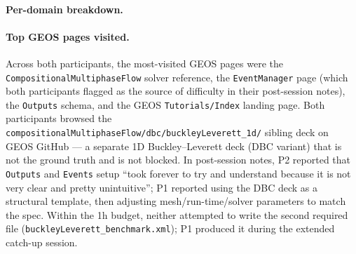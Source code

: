 \documentclass{article}
\begin{document}
\paragraph{Per-domain breakdown.}

\begin{table}[h]
  \caption{Browser-navigation breakdown during the one-hour authoring session, per participant. ``GEOS docs'' = visits to the GEOS Sphinx documentation host (\texttt{geosx-geosx.readthedocs-hosted.com}) including all subpages. ``GEOS GitHub'' = visits to \texttt{github.com/GEOS-DEV/GEOS}. ``Other'' = unrelated tabs that remained open during the session. No participant visited any LLM chatbot, Stack Overflow, or general scientific-paper site.}
  \label{tab:human-browser}
  \centering
  \small
\end{table}

\paragraph{Top GEOS pages visited.} Across both participants, the most-visited GEOS pages were the \texttt{CompositionalMultiphaseFlow} solver reference, the \texttt{EventManager} page (which both participants flagged as the source of difficulty in their post-session notes), the \texttt{Outputs} schema, and the GEOS \texttt{Tutorials/Index} landing page. Both participants browsed the \texttt{compositionalMultiphaseFlow/dbc/buckleyLeverett\_1d/} sibling deck on GEOS GitHub --- a separate 1D Buckley--Leverett deck (DBC variant) that is not the ground truth and is not blocked. In post-session notes, P2 reported that \texttt{Outputs} and \texttt{Events} setup ``took forever to try and understand because it is not very clear and pretty unintuitive''; P1 reported using the DBC deck as a structural template, then adjusting mesh/run-time/solver parameters to match the spec. Within the 1h budget, neither attempted to write the second required file (\texttt{buckleyLeverett\_benchmark.xml}); P1 produced it during the extended catch-up session.
\end{document}
